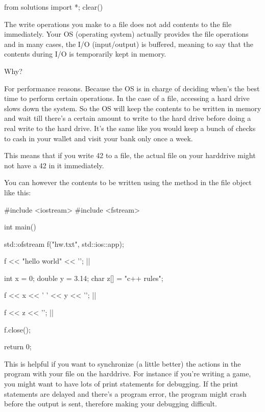\begin{python0}
from solutions import *; clear()
\end{python0}

The write operations you make to a file does not add contents to the file immediately. Your OS (operating system) actually provides the file operations and in many cases, the I/O (input/output) is buffered, meaning to say that the contents during I/O is temporarily kept in memory.

Why?

For performance reasons. Because the OS is in charge of deciding when's the best time to perform certain operations. In the case of a file, accessing a hard drive slows down the system. So the OS will keep the contents to be written in memory and wait till there's a certain amount to write to the hard drive before doing a real write to the hard drive. It's the same like you would keep a bunch of checks to cash in your wallet and visit your bank only once a week.

This means that if you write 42 to a file, the actual file on your harddrive might not have a 42 in it immediately.

You can however  the contents to be written  using the  method in the file object like this:

\begin{consolethree}[escapeinside=||]
#include <iostream>
#include <fstream>

int main()
{   
    std::ofstream f("hw.txt", std::ios::app);

    f << "hello world" << '\n';
    ||

    int x = 0;
    double y = 3.14;
    char z[] = "c++ rules";

    f << x << ' ' << y << '\n';
    ||

    f << z << '\n';
    ||

    f.close();

    return 0;

}
\end{consolethree}

This is helpful if you want to synchronize (a little better) the actions in the program with your file on the harddrive. For instance if you're writing a game, you might want to have lots of print statements for debugging. If the print statements are delayed and there's a program error, the program might crash before the output is sent, therefore making your debugging difficult.

